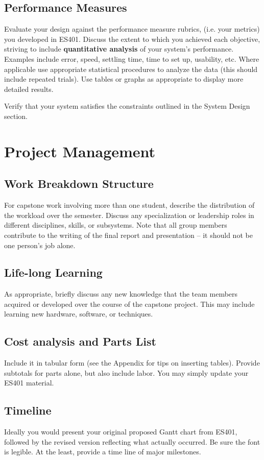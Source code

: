 \documentclass{wsecapstone}
\begin{document}
\subsection{Performance Measures}
Evaluate your design against the performance measure rubrics, (i.e. your metrics) you developed in ES401. Discuss the extent to which you achieved each objective, striving to include \textbf{quantitative analysis} of your system’s performance. Examples include error, speed, settling time, time to set up, usability, etc. Where applicable use appropriate statistical procedures to analyze the data (this should include repeated trials). Use tables or graphs as appropriate to display more detailed results.  

Verify that your system satisfies the constraints outlined in the System Design section.




\section{Project Management}

\subsection{Work Breakdown Structure}
For capstone work involving more than one student, describe the distribution of the workload over the semester. Discuss any specialization or leadership roles in different disciplines, skills, or subsystems. Note that all group members contribute to the writing of the final report and presentation – it should not be one person’s job alone.  

\subsection{Life-long Learning}
As appropriate, briefly discuss any new knowledge that the team members acquired or developed over the course of the capstone project. This may include learning new hardware, software, or techniques.

\subsection{Cost analysis and Parts List}
Include it in tabular form (see the Appendix for tips on inserting tables).  Provide subtotals for parts alone, but also include labor.  You may simply update your ES401 material.

\subsection{Timeline}
Ideally you would present your original proposed Gantt chart from ES401, followed by the revised version reflecting what actually occurred.   Be sure the font is legible.  At the least, provide a time line of major milestones.
\end{document}
